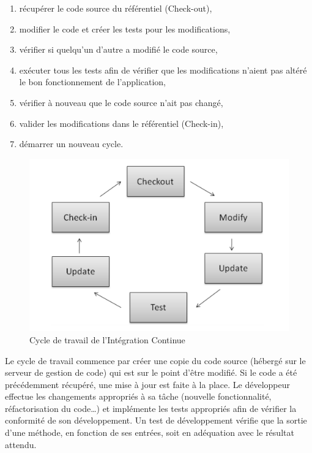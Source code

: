     \begin{enumerate}
      \item récupérer le code source du référentiel (Check-out),
      \item modifier le code et créer les tests pour les modifications,
      \item vérifier si quelqu'un d'autre a modifié le code source,
      \item exécuter tous les tests afin de vérifier que les modifications n’aient pas altéré le bon fonctionnement de l’application,
      \item vérifier à nouveau que le code source n'ait pas changé,
      \item valider les modifications dans le référentiel (Check-in),
      \item démarrer un nouveau cycle.\\
    \end{enumerate}

    \begin{figure}
      \begin{center}
        \includegraphics[scale=0.5]{images/ICWorkflow.png}
      \end{center}
      \caption{Cycle de travail de l’Intégration Continue}
      \label{IC workflow}
    \end{figure}

    Le cycle de travail commence par créer une copie du code source (hébergé sur le serveur de gestion de code) qui est sur le point d'être modifié. Si le code a été précédemment récupéré, une mise à jour est faite à la place. Le développeur effectue les changements appropriés à sa tâche (nouvelle fonctionnalité, réfactorisation du code…) et implémente les tests appropriés afin de vérifier la conformité de son développement. Un test de développement vérifie que la sortie d’une méthode, en fonction de ses entrées, soit en adéquation avec le résultat attendu.\\

